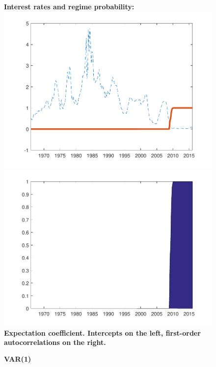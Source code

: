 \documentclass[12pt,reqno]{article}
\numberwithin{equation}{section}
\begin{document}
\begin{figure}[H]
\caption{\large{\textbf{VAR(1)}}}
\vspace{5 mm}

\textbf{Interest rates and regime probability:} \\

\includegraphics[scale=0.6]{NKPC_optim_init_VAR1_regime.pdf}
\includegraphics[scale=0.6]{NKPC_optim_init_VAR1_regimeProb.pdf}\\

\textbf{Expectation coefficient. Intercepts on the left, first-order autocorrelations on the right.}\\


\end{figure}
\end{document}
